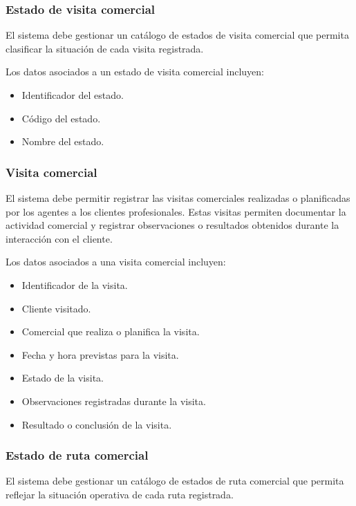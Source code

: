 \subsubsection*{Estado de visita comercial}

El sistema debe gestionar un catálogo de estados de visita comercial que permita clasificar la situación de cada visita registrada.

Los datos asociados a un estado de visita comercial incluyen:

\begin{itemize}
    \item Identificador del estado.
    \item Código del estado.
    \item Nombre del estado.
\end{itemize}

\subsubsection*{Visita comercial}

El sistema debe permitir registrar las visitas comerciales realizadas o planificadas por los agentes a los clientes profesionales. Estas visitas permiten documentar la actividad comercial y registrar observaciones o resultados obtenidos durante la interacción con el cliente.

Los datos asociados a una visita comercial incluyen:

\begin{itemize}
    \item Identificador de la visita.
    \item Cliente visitado.
    \item Comercial que realiza o planifica la visita.
    \item Fecha y hora previstas para la visita.
    \item Estado de la visita.
    \item Observaciones registradas durante la visita.
    \item Resultado o conclusión de la visita.
\end{itemize}

\subsubsection*{Estado de ruta comercial}

El sistema debe gestionar un catálogo de estados de ruta comercial que permita reflejar la situación operativa de cada ruta registrada.

